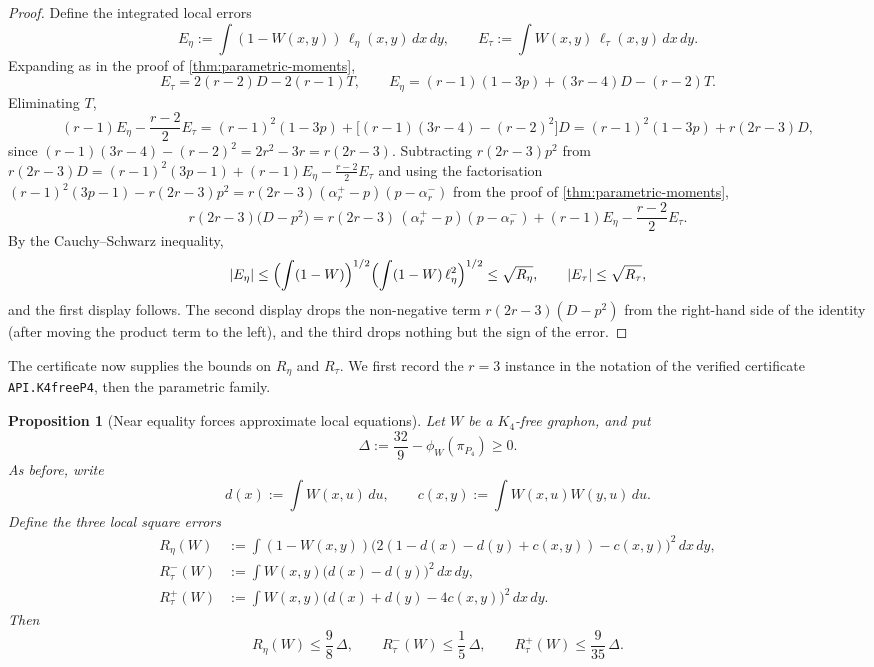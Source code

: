 \documentclass[11pt]{article}
\newtheorem{proposition}[proposition]{Proposition}
\theoremstyle{definition}
\begin{document}
\begin{proof}
Define the integrated local errors
\[
  E_\eta:=\int(1-W(x,y))\,\ell_\eta(x,y)\,dx\,dy,
  \qquad
  E_\tau:=\int W(x,y)\,\ell_\tau(x,y)\,dx\,dy .
\]
Expanding as in the proof of \cref{thm:parametric-moments},
\[
  E_\tau=2(r-2)D-2(r-1)T,
  \qquad
  E_\eta=(r-1)(1-3p)+(3r-4)D-(r-2)T .
\]
Eliminating $T$,
\[
  (r-1)E_\eta-\frac{r-2}{2}E_\tau
  =
  (r-1)^2(1-3p)+\bigl[(r-1)(3r-4)-(r-2)^2\bigr]D
  =
  (r-1)^2(1-3p)+r(2r-3)D,
\]
since $(r-1)(3r-4)-(r-2)^2=2r^2-3r=r(2r-3)$.  Subtracting $r(2r-3)p^2$ from
$r(2r-3)D=(r-1)^2(3p-1)+(r-1)E_\eta-\frac{r-2}{2}E_\tau$ and using the factorisation
$(r-1)^2(3p-1)-r(2r-3)p^2=r(2r-3)(\alpha_r^+-p)(p-\alpha_r^-)$ from the proof of
\cref{thm:parametric-moments},
\[
  r(2r-3)\bigl(D-p^2\bigr)
  =
  r(2r-3)\,(\alpha_r^+-p)(p-\alpha_r^-)
  +(r-1)E_\eta-\frac{r-2}{2}E_\tau .
\]
By the Cauchy--Schwarz inequality,
\[
  |E_\eta|
  \le
  \Bigl(\int(1-W)\Bigr)^{1/2}
  \Bigl(\int(1-W)\,\ell_\eta^2\Bigr)^{1/2}
  \le\sqrt{R_\eta},
  \qquad
  |E_\tau|\le\sqrt{R_\tau},
\]
and the first display follows.  The second display drops the non-negative term
$r(2r-3)(D-p^2)$ from the right-hand side of the identity (after moving the product term
to the left), and the third drops nothing but the sign of the error.
\end{proof}

The certificate now supplies the bounds on $R_\eta$ and $R_\tau$.  We first record the
$r=3$ instance in the notation of the verified certificate \texttt{API.K4freeP4}, then
the parametric family.

\begin{proposition}[Near equality forces approximate local equations]
\label{prop:k4free-p4-certificate-stability}
Let $W$ be a $K_4$-free graphon, and put
\[
  \Delta:=\frac{32}{9}-\phi_W(\pi_{P_4})\ge0 .
\]
As before, write
\[
  d(x):=\int W(x,u)\,du,\qquad
  c(x,y):=\int W(x,u)W(y,u)\,du .
\]
Define the three local square errors
\[
\begin{aligned}
  R_\eta(W)
    &:=\int (1-W(x,y))
      \bigl(2(1-d(x)-d(y)+c(x,y))-c(x,y)\bigr)^2\,dx\,dy,\\
  R_\tau^{-}(W)
    &:=\int W(x,y)\bigl(d(x)-d(y)\bigr)^2\,dx\,dy,\\
  R_\tau^{+}(W)
    &:=\int W(x,y)\bigl(d(x)+d(y)-4c(x,y)\bigr)^2\,dx\,dy .
\end{aligned}
\]
Then
\[
  R_\eta(W)\le\frac98\,\Delta,\qquad
  R_\tau^{-}(W)\le\frac15\,\Delta,\qquad
  R_\tau^{+}(W)\le\frac9{35}\,\Delta .
\]
\end{proposition}
\end{document}
